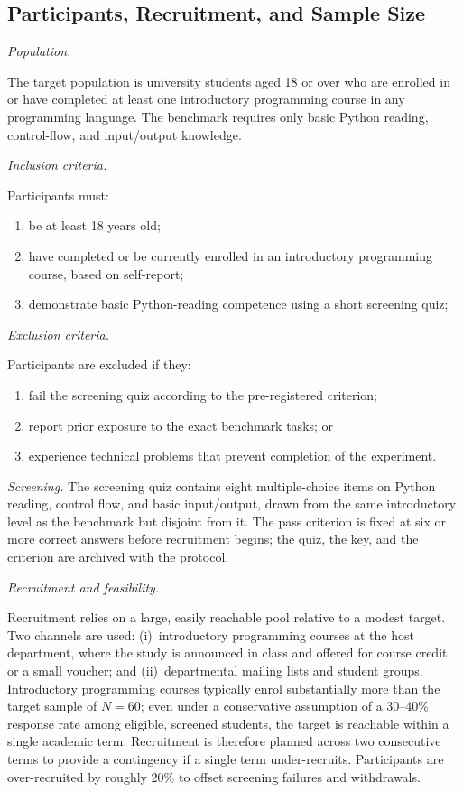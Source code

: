 \documentclass[oneside,final,14pt,a4paper]{extreport}
\begin{document}
\subsection{Participants, Recruitment, and Sample Size}
\label{subsec:participants}

\emph{Population.}

The target population is university students aged 18 or over who are enrolled
in or have completed at least one introductory programming course in any
programming language. The benchmark requires only basic Python reading,
control-flow, and input/output knowledge.

\emph{Inclusion criteria.}

Participants must:

\begin{enumerate}
\item be at least 18 years old;
\item have completed or be currently enrolled in an introductory programming
course, based on self-report;
\item demonstrate basic Python-reading competence using a short screening
quiz;
\end{enumerate}

\emph{Exclusion criteria.}

Participants are excluded if they:

\begin{enumerate}
\item fail the screening quiz according to the pre-registered criterion;
\item report prior exposure to the exact benchmark tasks; or
\item experience technical problems that prevent completion of the experiment.
\end{enumerate}

\emph{Screening.} The screening quiz contains eight multiple-choice items on
Python reading, control flow, and basic input/output, drawn from the same
introductory level as the benchmark but disjoint from it. The pass criterion
is fixed at six or more correct answers before recruitment begins; the quiz,
the key, and the criterion are archived with the protocol.

\emph{Recruitment and feasibility.}

Recruitment relies on a large, easily reachable pool relative to a modest
target. Two channels are used: (i)~introductory programming courses at the host
department, where the study is announced in class and offered for course credit
or a small voucher; and (ii)~departmental mailing lists and student groups.
Introductory programming courses typically enrol substantially more than the
target sample of $N=60$; even under a conservative assumption of a 30--40\%
response rate among eligible, screened students, the target is reachable within
a single academic term. Recruitment is therefore planned across two consecutive
terms to provide a contingency if a single term under-recruits. Participants
are over-recruited by roughly 20\% to offset screening failures and
withdrawals.
\end{document}

